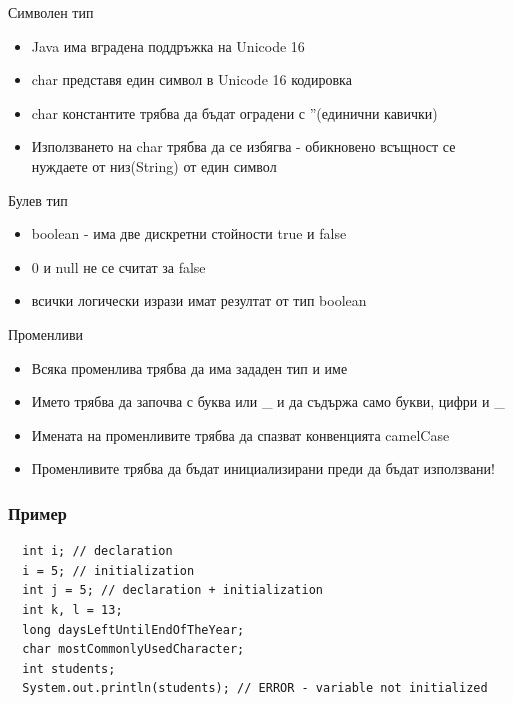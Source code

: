 \documentclass{beamer}
\begin{document}
\begin{frame}{Символен тип}
  \transdissolve
  \begin{itemize}
  \item Java има вградена поддръжка на Unicode 16
  \item char представя един символ в Unicode 16 кодировка
  \item char константите трябва да бъдат оградени с ''(единични
    кавички)
  \item Използването на char трябва да се избягва - обикновено
    всъщност се нуждаете от низ(String) от един символ
  \end{itemize}
\end{frame}

\begin{frame}{Булев тип}
  \transdissolve
  \begin{itemize}
  \item boolean - има две дискретни стойности true и false
  \item 0 и null не се считат за false
  \item всички логически изрази имат резултат от тип boolean
  \end{itemize}
\end{frame}

\begin{frame}{Променливи}
  \transdissolve
  \begin{itemize}
  \item Всяка променлива трябва да има
    зададен тип и име
  \item Името трябва да започва с буква или \_
    и да съдържа само букви, цифри и \_
  \item Имената на променливите трябва да спазват конвенцията camelCase
  \item Променливите трябва да бъдат инициализирани преди да бъдат използвани!
  \end{itemize}
\end{frame}

\begin{frame}[fragile]
  \frametitle{Пример}
  \transdissolve
\begin{lstlisting}
  int i; // declaration
  i = 5; // initialization
  int j = 5; // declaration + initialization
  int k, l = 13;
  long daysLeftUntilEndOfTheYear;
  char mostCommonlyUsedCharacter;
  int students;
  System.out.println(students); // ERROR - variable not initialized
\end{lstlisting}
\end{frame}
\end{document}
